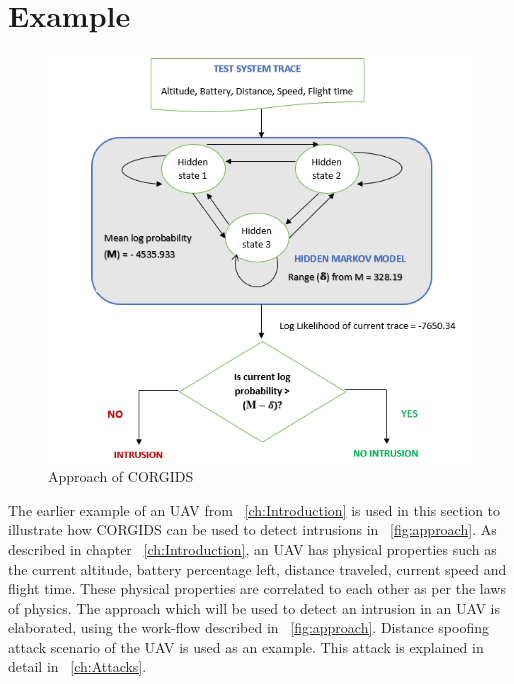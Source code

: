 \section{Example}

\begin{figure}[ht]
    \centering
    \includegraphics[scale=0.75,keepaspectratio = true]{Graphics/CORGIDSApproach.png}
    \caption{Approach of CORGIDS}
    \label{fig:approach}
\end{figure}

The earlier example of an \ac{UAV} from ~\autoref{ch:Introduction} is used in this section to illustrate how \ac{CORGIDS} can be used to detect intrusions in ~\autoref{fig:approach}. As described in chapter ~\autoref{ch:Introduction}, an \ac{UAV} has physical properties such as the current altitude, battery percentage left, distance traveled, current speed and flight time. These physical properties are correlated to each other as per the laws of physics. The approach which will be used to detect an intrusion in an \ac{UAV} is elaborated, using the work-flow described in ~\autoref{fig:approach}. Distance spoofing attack scenario of the \ac{UAV} is used as an example. This attack is explained in detail in ~\autoref{ch:Attacks}.

